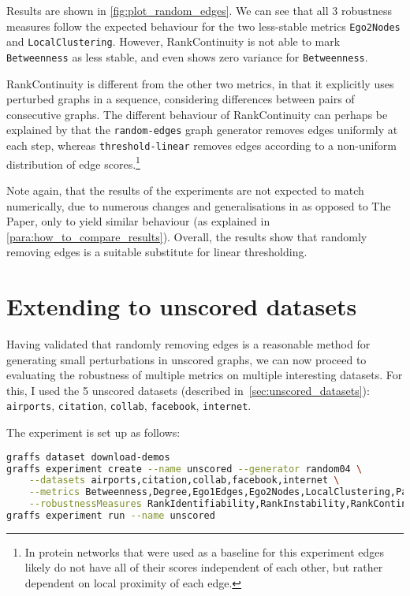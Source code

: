 

Results are shown in \autoref{fig:plot_random_edges}.
We can see that all 3 robustness measures follow the expected behaviour for the two less-stable metrics \texttt{Ego2Nodes} and \texttt{LocalClustering}.
However, RankContinuity is not able to mark \texttt{Betweenness} as less stable, and even shows zero variance for \texttt{Betweenness}.

RankContinuity is different from the other two metrics, in that it explicitly uses perturbed graphs in a sequence, considering differences between pairs of consecutive graphs.
The different behaviour of RankContinuity can perhaps be explained by that the \texttt{random-edges} graph generator removes edges uniformly at each step, whereas \texttt{threshold-linear} removes edges according to a non-uniform distribution of edge scores.\footnote{In protein networks that were used as a baseline for this experiment edges likely do not have all of their scores independent of each other, but rather dependent on local proximity of each edge.}

Note again, that the results of the experiments are not expected to match numerically, due to numerous changes and generalisations in \graffs as opposed to The Paper, only to yield similar behaviour (as explained in \autoref{para:how_to_compare_results}).
Overall, the results show that randomly removing edges is a suitable substitute for linear thresholding.


\section{Extending to unscored datasets}

Having validated that randomly removing edges is a reasonable method for generating small perturbations in unscored graphs, we can now proceed to evaluating the  robustness of multiple metrics on multiple interesting datasets.
For this, I used the 5 unscored datasets (described in~\autoref{sec:unscored_datasets}): \texttt{airports}, \texttt{citation}, \texttt{collab}, \texttt{facebook}, \texttt{internet}.

The experiment is set up as follows:
\begin{lstlisting}[language=bash]
graffs dataset download-demos
graffs experiment create --name unscored --generator random04 \
    --datasets airports,citation,collab,facebook,internet \
    --metrics Betweenness,Degree,Ego1Edges,Ego2Nodes,LocalClustering,PageRank,Redundancy \
    --robustnessMeasures RankIdentifiability,RankInstability,RankContinuity
graffs experiment run --name unscored
\end{lstlisting}

